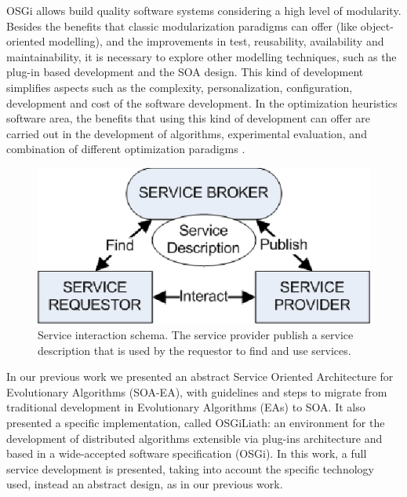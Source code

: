 \documentclass{sig-alternate}
\begin{document}
OSGi allows build quality software systems considering a high level of modularity. Besides the benefits that classic
modularization paradigms can offer (like object-oriented modelling),
and the improvements in test, reusability, availability and
maintainability, it is necessary to explore other modelling techniques, such as the
plug-in based development and the SOA design. This kind of development
simplifies aspects such as the complexity, personalization, configuration,
development and cost of the software development. In the optimization
heuristics software area, the benefits that using this kind of
development can offer are carried out in the development of algorithms,
experimental evaluation, and combination of different optimization
paradigms \cite{PLUGINS}.  





\begin{figure}[ht] 
\begin{center} 
\includegraphics[scale=1]{images/soaDiagram.eps}
\end{center} 
\caption{Service interaction schema. The service provider publish a service description that is used by the requestor to find and use services.} 
\label{SOADIAGRAM} 
\end{figure} 







In our previous work \cite{OSGILIATH} we presented an abstract Service Oriented Architecture for Evolutionary Algorithms (SOA-EA), with guidelines and steps to migrate from traditional development in Evolutionary Algorithms (EAs) to SOA. It also presented a specific implementation, called OSGiLiath: an environment for the development of distributed algorithms extensible via plug-ins architecture and based in a wide-accepted software specification (OSGi). In this work, a full service development is presented, taking into account the specific technology used, instead an abstract design, as in our previous work.
\end{document}
